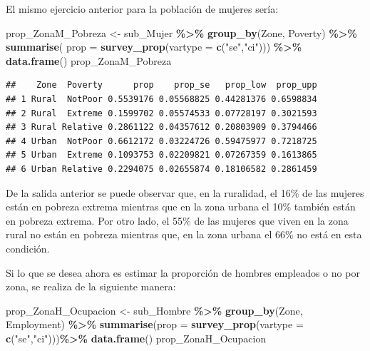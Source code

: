 \documentclass[
  12pt,
]{book}
\newenvironment{Shaded}{\begin{snugshade}}{\end{snugshade}}
\newcommand{\AttributeTok}[1]{\textcolor[rgb]{0.13,0.29,0.53}{#1}}
\newcommand{\FunctionTok}[1]{\textcolor[rgb]{0.13,0.29,0.53}{\textbf{#1}}}
\newcommand{\NormalTok}[1]{#1}
\newcommand{\OtherTok}[1]{\textcolor[rgb]{0.56,0.35,0.01}{#1}}
\newcommand{\SpecialCharTok}[1]{\textcolor[rgb]{0.81,0.36,0.00}{\textbf{#1}}}
\newcommand{\StringTok}[1]{\textcolor[rgb]{0.31,0.60,0.02}{#1}}
\begin{document}
El mismo ejercicio anterior para la población de mujeres sería:

\begin{Shaded}
\begin{Highlighting}[]
\NormalTok{prop\_ZonaM\_Pobreza }\OtherTok{\textless{}{-}}\NormalTok{ sub\_Mujer }\SpecialCharTok{\%\textgreater{}\%} 
                      \FunctionTok{group\_by}\NormalTok{(Zone, Poverty) }\SpecialCharTok{\%\textgreater{}\%} 
                      \FunctionTok{summarise}\NormalTok{( }\AttributeTok{prop =} \FunctionTok{survey\_prop}\NormalTok{(}\AttributeTok{vartype =} \FunctionTok{c}\NormalTok{(}\StringTok{"se"}\NormalTok{,}\StringTok{"ci"}\NormalTok{))) }\SpecialCharTok{\%\textgreater{}\%}
                      \FunctionTok{data.frame}\NormalTok{()}
\NormalTok{prop\_ZonaM\_Pobreza}
\end{Highlighting}
\end{Shaded}

\begin{verbatim}
##    Zone  Poverty      prop    prop_se   prop_low  prop_upp
## 1 Rural  NotPoor 0.5539176 0.05568825 0.44281376 0.6598834
## 2 Rural  Extreme 0.1599702 0.05574533 0.07728197 0.3021593
## 3 Rural Relative 0.2861122 0.04357612 0.20803909 0.3794466
## 4 Urban  NotPoor 0.6612172 0.03224726 0.59475977 0.7218725
## 5 Urban  Extreme 0.1093753 0.02209821 0.07267359 0.1613865
## 6 Urban Relative 0.2294075 0.02655874 0.18106582 0.2861459
\end{verbatim}

De la salida anterior se puede observar que, en la ruralidad, el 16\% de las mujeres están en pobreza extrema mientras que en la zona urbana el 10\% también están en pobreza extrema. Por otro lado, el 55\% de las mujeres que viven en la zona rural no están en pobreza mientras que, en la zona urbana el 66\% no está en esta condición.

Si lo que se desea ahora es estimar la proporción de hombres empleados o no por zona, se realiza de la siguiente manera:

\begin{Shaded}
\begin{Highlighting}[]
\NormalTok{prop\_ZonaH\_Ocupacion }\OtherTok{\textless{}{-}}\NormalTok{ sub\_Hombre }\SpecialCharTok{\%\textgreater{}\%}
                        \FunctionTok{group\_by}\NormalTok{(Zone, Employment) }\SpecialCharTok{\%\textgreater{}\%} 
                        \FunctionTok{summarise}\NormalTok{(}\AttributeTok{prop =} \FunctionTok{survey\_prop}\NormalTok{(}\AttributeTok{vartype =} \FunctionTok{c}\NormalTok{(}\StringTok{"se"}\NormalTok{,}\StringTok{"ci"}\NormalTok{)))}\SpecialCharTok{\%\textgreater{}\%}
                        \FunctionTok{data.frame}\NormalTok{()}
\NormalTok{prop\_ZonaH\_Ocupacion}
\end{Highlighting}
\end{Shaded}
\end{document}
